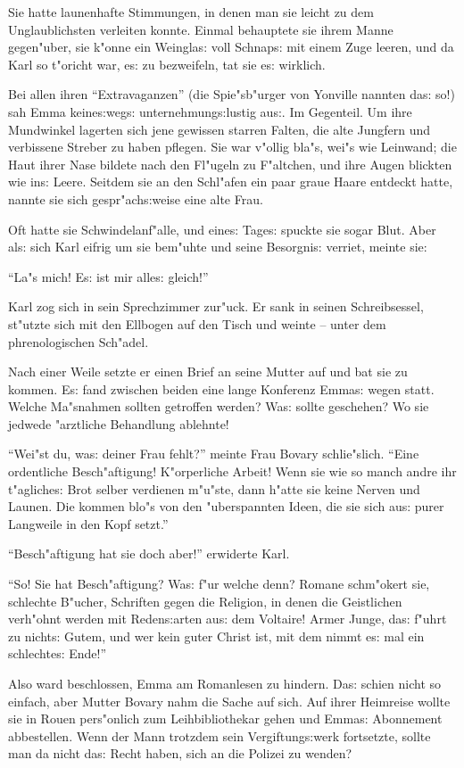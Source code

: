 \documentclass[oneside,12pt]{book}
\newcommand{\s}{s:}%
\begin{document}
Sie hatte launenhafte Stimmungen, in denen man sie leicht zu dem
Unglaublichsten verleiten konnte. Einmal behauptete sie ihrem
Manne gegen\-"uber, sie k"onne ein Weingla{\s} voll Schnap{\s} mit
einem Zuge leeren, und da Karl so t"oricht war, e{\s} zu
bezweifeln, tat sie e{\s} wirklich.

Bei allen ihren "`Extravaganzen"' (die Spie"sb"urger von Yonville
nannten da{\s} so!) sah Emma keine{\s}weg{\s}
unternehmung{\s}lustig au{\s}. Im Gegenteil. Um ihre Mundwinkel
lagerten sich jene gewissen starren Falten, die alte Jungfern und
verbissene Streber zu haben pflegen. Sie war v"ollig bla"s, wei"s
wie Leinwand; die Haut ihrer Nase bildete nach den Fl"ugeln zu
F"altchen, und ihre Augen blickten wie in{\s} Leere. Seitdem sie
an den Schl"afen ein paar graue Haare entdeckt hatte, nannte sie
sich gespr"ach{\s}weise eine alte Frau.

Oft hatte sie Schwindelanf"alle, und eine{\s} Tage{\s} spuckte sie
sogar Blut. Aber al{\s} sich Karl eifrig um sie bem"uhte und seine
Besorgni{\s} verriet, meinte sie:

"`La"s mich! E{\s} ist mir alle{\s} gleich!"'

Karl zog sich in sein Sprechzimmer zur"uck. Er sank in seinen
Schreibsessel, st"utzte sich mit den Ellbogen auf den Tisch und
weinte -- unter dem phrenologischen Sch"adel.

Nach einer Weile setzte er einen Brief an seine Mutter auf und bat
sie zu kommen. E{\s} fand zwischen beiden eine lange Konferenz
Emma{\s} wegen statt. Welche Ma"snahmen sollten getroffen werden?
Wa{\s} sollte geschehen? Wo sie jedwede "arztliche Behandlung
ablehnte!

"`Wei"st du, wa{\s} deiner Frau fehlt?"' meinte Frau Bovary
schlie"slich. "`Eine ordentliche Besch"aftigung! K"orperliche
Arbeit! Wenn sie wie so manch andre ihr t"agliche{\s} Brot selber
verdienen m"u"ste, dann h"atte sie keine Nerven und Launen. Die
kommen blo"s von den "uberspannten Ideen, die sie sich au{\s}
purer Langweile in den Kopf setzt."'

"`Besch"aftigung hat sie doch aber!"' erwiderte Karl.

"`So! Sie hat Besch"aftigung? Wa{\s} f"ur welche denn? Romane
schm"okert sie, schlechte B"ucher, Schriften gegen die Religion,
in denen die Geistlichen verh"ohnt werden mit Reden{\s}arten
au{\s} dem Voltaire! Armer Junge, da{\s} f"uhrt zu nicht{\s}
Gutem, und wer kein guter Christ ist, mit dem nimmt e{\s} mal ein
schlechte{\s} Ende!"'

Also ward beschlossen, Emma am Romanlesen zu hindern. Da{\s}
schien nicht so einfach, aber Mutter Bovary nahm die Sache auf
sich. Auf ihrer Heimreise wollte sie in Rouen pers"onlich zum
Leihbibliothekar gehen und Emma{\s} Abonnement abbestellen. Wenn
der Mann trotzdem sein Vergiftung{\s}werk fortsetzte, sollte man
da nicht da{\s} Recht haben, sich an die Polizei zu wenden?
\end{document}
